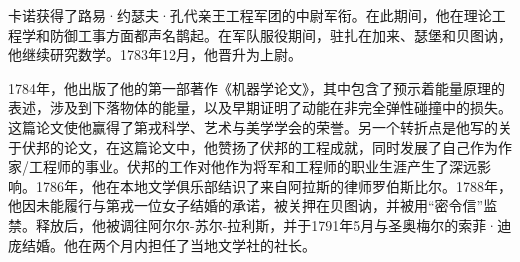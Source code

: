 卡诺获得了路易·约瑟夫·孔代亲王工程军团的中尉军衔。在此期间，他在理论工程学和防御工事方面都声名鹊起。在军队服役期间，驻扎在加来、瑟堡和贝图讷，他继续研究数学。1783年12月，他晋升为上尉。

1784年，他出版了他的第一部著作《机器学论文》，其中包含了预示着能量原理的表述，涉及到下落物体的能量，以及早期证明了动能在非完全弹性碰撞中的损失。这篇论文使他赢得了第戎科学、艺术与美学学会的荣誉。另一个转折点是他写的关于伏邦的论文，在这篇论文中，他赞扬了伏邦的工程成就，同时发展了自己作为作家/工程师的事业。伏邦的工作对他作为将军和工程师的职业生涯产生了深远影响。1786年，他在本地文学俱乐部结识了来自阿拉斯的律师罗伯斯比尔。1788年，他因未能履行与第戎一位女子结婚的承诺，被关押在贝图讷，并被用“密令信”监禁。释放后，他被调往阿尔尔-苏尔-拉利斯，并于1791年5月与圣奥梅尔的索菲·迪庞结婚。他在两个月内担任了当地文学社的社长。